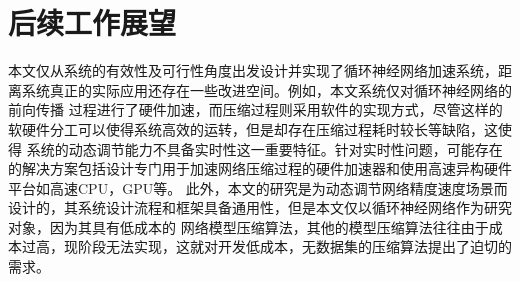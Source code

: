 \section{后续工作展望}
本文仅从系统的有效性及可行性角度出发设计并实现了循环神经网络加速系统，距离系统真正的实际应用还存在一些改进空间。例如，本文系统仅对循环神经网络的前向传播
过程进行了硬件加速，而压缩过程则采用软件的实现方式，尽管这样的软硬件分工可以使得系统高效的运转，但是却存在压缩过程耗时较长等缺陷，这使得
系统的动态调节能力不具备实时性这一重要特征。针对实时性问题，可能存在的解决方案包括设计专门用于加速网络压缩过程的硬件加速器和使用高速异构硬件平台如高速CPU，GPU等。
此外，本文的研究是为动态调节网络精度速度场景而设计的，其系统设计流程和框架具备通用性，但是本文仅以循环神经网络作为研究对象，因为其具有低成本的
网络模型压缩算法，其他的模型压缩算法往往由于成本过高，现阶段无法实现，这就对开发低成本，无数据集的压缩算法提出了迫切的需求。
